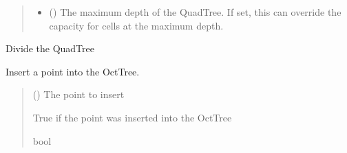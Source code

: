 \documentclass[letterpaper,10pt,english]{sphinxmanual}
\begin{document}
\begin{fulllineitems}
\begin{quote}
\begin{description}
\begin{itemize}
\item {}
\sphinxAtStartPar
{} (\sphinxstyleliteralemphasis{\sphinxupquote{ | }}) \textendash{} The maximum depth of the QuadTree. If set, this can override the
capacity for cells at the maximum depth.

\end{itemize}

\end{description}\end{quote}

\begin{fulllineitems}
\label{\detokenize{octtree:geotrees.octtree.OctTree.divide}}
\pysigstartsignatures
\pysiglinewithargsret
{}
{}
{}
\pysigstopsignatures
\sphinxAtStartPar
Divide the QuadTree

\end{fulllineitems}


\begin{fulllineitems}
\label{\detokenize{octtree:geotrees.octtree.OctTree.insert}}
\pysigstartsignatures
\pysiglinewithargsret
{}
{}
{}
\pysigstopsignatures
\sphinxAtStartPar
Insert a point into the OctTree.
\begin{quote}\begin{description}
\sphinxAtStartPar
{} () \textendash{} The point to insert

\sphinxAtStartPar
True if the point was inserted into the OctTree

\sphinxAtStartPar
bool

\end{description}\end{quote}

\end{fulllineitems}



\end{fulllineitems}
\end{document}
